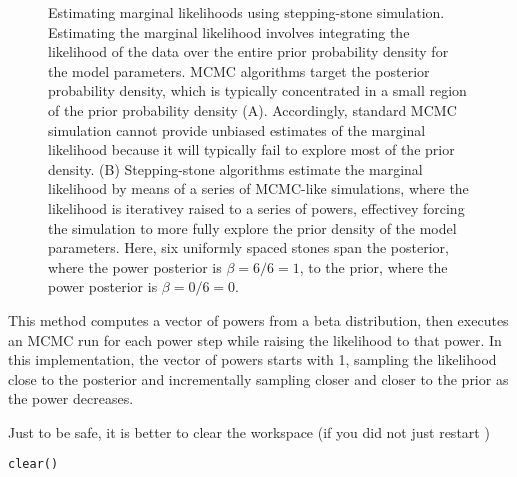 \begin{figure}[h!]
\centering
{}
\caption{\small Estimating marginal likelihoods using stepping-stone simulation. 
Estimating the marginal likelihood involves integrating the likelihood of the data over the entire prior probability density for the model parameters.
MCMC algorithms target the posterior probability density, which is typically concentrated in a small region of the prior probability density (A).
Accordingly, standard MCMC simulation cannot provide unbiased estimates of the marginal likelihood because it will typically fail to explore most of the prior density.
(B) Stepping-stone algorithms estimate the marginal likelihood by means of a series of MCMC-like simulations, where the likelihood is iterativey raised to a series of powers, effectivey forcing the simulation to more fully explore the prior density of the model parameters.
Here, six uniformly spaced stones span the posterior, where the power posterior is $\beta=6/6=1$, to the prior, where the power posterior is $\beta=0/6=0$.}
\label{fig:jc}
\end{figure}


This method computes a vector of powers from a beta distribution, then executes an MCMC run for each power step while raising the likelihood to that power. In this implementation, the vector of powers starts with 1, sampling the likelihood close to the posterior and incrementally sampling closer and closer to the prior as the power decreases. 




Just to be safe, it is better to clear the workspace (if you did not just restart \RevBayes)
{\tt \begin{snugshade*}
\begin{lstlisting}
clear()
\end{lstlisting}
\end{snugshade*}}

